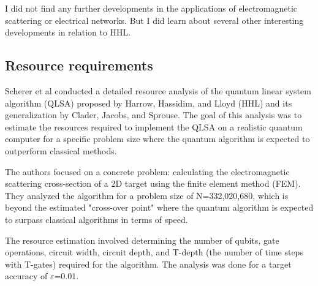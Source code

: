 \documentclass[12pt]{extarticle}
\begin{document}
I did not find any further developments in the applications of electromagnetic scattering or electrical networks.
But I did learn about several other interesting developments in relation to HHL.


\subsection{Resource requirements}


Scherer et al\cite{scherer2017concrete} conducted a detailed resource analysis of the quantum linear system algorithm (QLSA) proposed by Harrow, Hassidim, and Lloyd (HHL) and its generalization by Clader, Jacobs, and Sprouse.
The goal of this analysis was to estimate the resources required to implement the QLSA on a realistic quantum computer for a specific problem size where the quantum algorithm is expected to outperform classical methods.

The authors focused on a concrete problem: calculating the electromagnetic scattering cross-section of a 2D target using the finite element method (FEM). They analyzed the algorithm for a problem size of N=332,020,680, which is beyond the estimated "cross-over point" where the quantum algorithm is expected to surpass classical algorithms in terms of speed.

The resource estimation involved determining the number of qubits, gate operations, circuit width, circuit depth, and T-depth
(the number of time steps with T-gates) required for the algorithm. The analysis was done for a target accuracy of $\varepsilon$=0.01.
\end{document}
